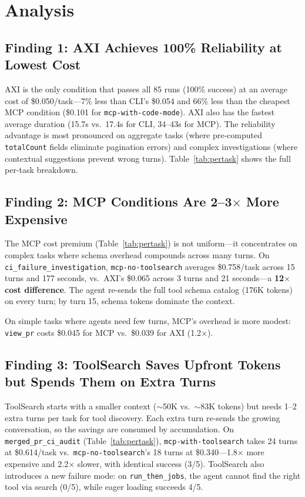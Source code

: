 \documentclass{article}
\begin{document}
\section{Analysis}
\label{sec:analysis}

\subsection{Finding 1: AXI Achieves 100\% Reliability at Lowest Cost}

AXI is the only condition that passes all 85 runs (100\% success) at an
average cost of \$0.050/task---7\% less than CLI's \$0.054 and 66\% less than
the cheapest MCP condition (\$0.101 for \texttt{mcp-with-code-mode}). AXI also has the fastest
average duration (15.7s vs.\ 17.4s for CLI, 34--43s for MCP). The reliability
advantage is most pronounced on aggregate tasks (where pre-computed
\texttt{totalCount} fields eliminate pagination errors) and complex
investigations (where contextual suggestions prevent wrong turns).
Table~\ref{tab:pertask} shows the full per-task breakdown.

\subsection{Finding 2: MCP Conditions Are 2--3$\times$ More Expensive}

The MCP cost premium (Table~\ref{tab:pertask}) is not uniform---it
concentrates on complex tasks where schema overhead compounds across many
turns.
On \texttt{ci\_failure\_investigation}, \texttt{mcp-no-toolsearch} averages \$0.758/task
across 15 turns and 177 seconds, vs.\ AXI's \$0.065 across 3 turns and
21 seconds---a \textbf{12$\times$ cost difference}. The agent re-sends the
full tool schema catalog (176K tokens) on every turn; by turn 15, schema
tokens dominate the context.

On simple tasks where agents need few turns, MCP's overhead is more modest:
\texttt{view\_pr} costs \$0.045 for MCP vs.\ \$0.039 for AXI (1.2$\times$).

\subsection{Finding 3: ToolSearch Saves Upfront Tokens but Spends Them on Extra Turns}

ToolSearch starts with a smaller context ($\sim$50K vs.\ $\sim$83K tokens)
but needs 1--2 extra turns per task for tool discovery. Each extra turn
re-sends the growing conversation, so the savings are consumed by
accumulation. On \texttt{merged\_pr\_ci\_audit} (Table~\ref{tab:pertask}),
\texttt{mcp-with-toolsearch} takes 24 turns at \$0.614/task vs.\
\texttt{mcp-no-toolsearch}'s 18 turns at \$0.340---1.8$\times$ more
expensive and 2.2$\times$ slower, with identical success (3/5). ToolSearch also introduces a new failure mode: on
\texttt{run\_then\_jobs}, the agent cannot find the right tool via search
(0/5), while eager loading succeeds 4/5.
\end{document}
